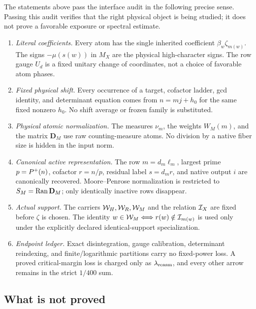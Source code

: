 The statements above pass the interface audit in the following precise
sense.  Passing this audit verifies that the right physical object is being
studied; it does not prove a favorable exposure or spectral estimate.
\begin{enumerate}[label=\textup{(A\arabic*)},leftmargin=3.2em]
 \item \emph{Literal coefficients.}
       Every atom has the single inherited coefficient
       \(\beta_w\zeta_{m(w)}\).  The signs
       \(-\mu(s(w))\) in \(M_X\) are the physical high-character signs.
       The row gauge \(U_d\) is a fixed unitary change of coordinates,
       not a choice of favorable atom phases.
 \item \emph{Fixed physical shift.}
       Every occurrence of a target, cofactor ladder, gcd identity, and
       determinant equation comes from \(n=mj+h_0\) for the same fixed
       nonzero \(h_0\).  No shift average or frozen family is substituted.
 \item \emph{Physical atomic normalization.}
       The measures \(\nu_m\), the weights \(W_M(m)\), and the matrix
       \(\mathbf D_M\) use raw counting-measure atoms.  No division by a
       native fiber size is hidden in the input norm.
 \item \emph{Canonical active representation.}
       The row \(m=d_m\ell_m\), largest prime \(p=P^{+}(n)\), cofactor
       \(r=n/p\), residual label \(s=d_mr\), and native output \(i\) are
       canonically recovered.  Moore--Penrose normalization is restricted
       to \(S_M=\operatorname{Ran}\mathbf D_M\); only identically inactive rows disappear.
 \item \emph{Actual support.}
       The carriers \(\mathcal W_H,\mathcal W_R,\mathcal W_M\) and the relation \(\mathcal I_X\) are
       fixed before \(\zeta\) is chosen.  The identity
       \(w\in\mathcal W_M\Longleftrightarrow r(w)\notin\mathcal I_{m(w)}\) is used only
       under the explicitly declared identical-support specialization.
 \item \emph{Endpoint ledger.}
       Exact disintegration, gauge calibration, determinant reindexing,
       and finite/logarithmic partitions carry no fixed-power loss.  A
       proved critical-margin loss is charged only as
       \(\lambda_{\rm reasm}\), and every other arrow remains in the
       strict \(1/400\) sum.
\end{enumerate}

\subsection{What is not proved}

